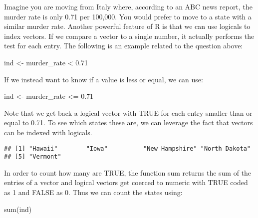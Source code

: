 \documentclass[
]{article}
\newenvironment{Shaded}{\begin{snugshade}}{\end{snugshade}}
\newcommand{\FloatTok}[1]{\textcolor[rgb]{0.00,0.00,0.81}{#1}}
\newcommand{\FunctionTok}[1]{\textcolor[rgb]{0.00,0.00,0.00}{#1}}
\newcommand{\NormalTok}[1]{#1}
\newcommand{\OtherTok}[1]{\textcolor[rgb]{0.56,0.35,0.01}{#1}}
\newcommand{\SpecialCharTok}[1]{\textcolor[rgb]{0.00,0.00,0.00}{#1}}
\begin{document}
Imagine you are moving from Italy where, according to an ABC news
report, the murder rate is only 0.71 per 100,000. You would prefer to
move to a state with a similar murder rate. Another powerful feature of
R is that we can use logicals to index vectors. If we compare a vector
to a single number, it actually performs the test for each entry. The
following is an example related to the question above:

\begin{Shaded}
\begin{Highlighting}[]
\NormalTok{ind }\OtherTok{\textless{}{-}}\NormalTok{ murder\_rate }\SpecialCharTok{\textless{}} \FloatTok{0.71}
\end{Highlighting}
\end{Shaded}

If we instead want to know if a value is less or equal, we can use:

\begin{Shaded}
\begin{Highlighting}[]
\NormalTok{ind }\OtherTok{\textless{}{-}}\NormalTok{ murder\_rate }\SpecialCharTok{\textless{}=} \FloatTok{0.71}
\end{Highlighting}
\end{Shaded}

Note that we get back a logical vector with TRUE for each entry smaller
than or equal to 0.71. To see which states these are, we can leverage
the fact that vectors can be indexed with logicals.

\begin{Shaded}
\end{Shaded}

\begin{verbatim}
## [1] "Hawaii"        "Iowa"          "New Hampshire" "North Dakota" 
## [5] "Vermont"
\end{verbatim}

In order to count how many are TRUE, the function sum returns the sum of
the entries of a vector and logical vectors get coerced to numeric with
TRUE coded as 1 and FALSE as 0. Thus we can count the states using:

\begin{Shaded}
\begin{Highlighting}[]
\FunctionTok{sum}\NormalTok{(ind)}
\end{Highlighting}
\end{Shaded}
\end{document}
